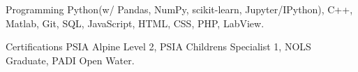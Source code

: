 

\begin{cvskills}

  \cvskill
    {Programming} %
    {Python(w/ Pandas, NumPy, scikit-learn, Jupyter/IPython), C++, Matlab, Git, SQL, JavaScript, HTML, CSS, PHP, LabView.}  %

  \cvskill
    {Certifications} %
    {PSIA Alpine Level 2, PSIA Childrens Specialist 1, NOLS Graduate, PADI Open Water.} %

\end{cvskills}
